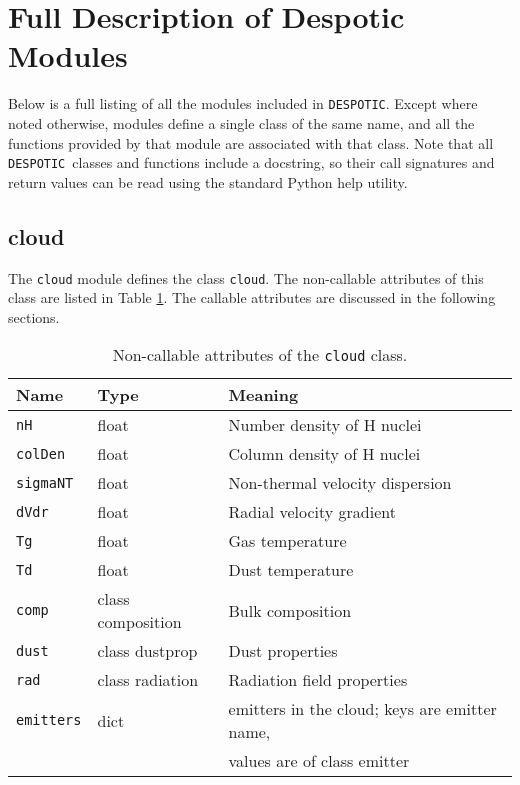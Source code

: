 \documentclass[12pt]{article}
\newcommand{\despotic}{\texttt{DESPOTIC}}
\begin{document}
\clearpage

\section{Full Description of Despotic Modules}
\label{sec:full}

Below is a full listing of all the modules included in \despotic. Except where noted otherwise, modules define a single class of the same name, and all the functions provided by that module are associated with that class. Note that all \despotic\ classes and functions include a docstring, so their call signatures and return values can be read using the standard Python help utility.

\subsection{cloud}
\label{sec:cloud}

The \verb=cloud= module defines the class \verb=cloud=. The non-callable attributes of this class are listed in Table \ref{tab:cloudattr}. The callable attributes are discussed in the following sections.

\begin{table}
\begin{center}
\begin{tabular}{lll}
\hline\hline
Name & Type & Meaning \\
\hline\hline
\texttt{nH} & float & Number density of H nuclei \\
\texttt{colDen} & float & Column density of H nuclei \\
\texttt{sigmaNT} & float & Non-thermal velocity dispersion \\
\texttt{dVdr} & float & Radial velocity gradient \\
\texttt{Tg} & float & Gas temperature \\
\texttt{Td} & float & Dust temperature \\
\texttt{comp} & class composition & Bulk composition \\
\texttt{dust} & class dustprop & Dust properties \\
\texttt{rad} & class radiation & Radiation field properties \\
\texttt{emitters} & dict & emitters in the cloud; keys are emitter name,\\
& & \qquad values are of class emitter \\
\hline
\end{tabular}
\caption{
\label{tab:cloudattr}
Non-callable attributes of the \texttt{cloud} class.
}
\end{center}
\end{table}
\end{document}
